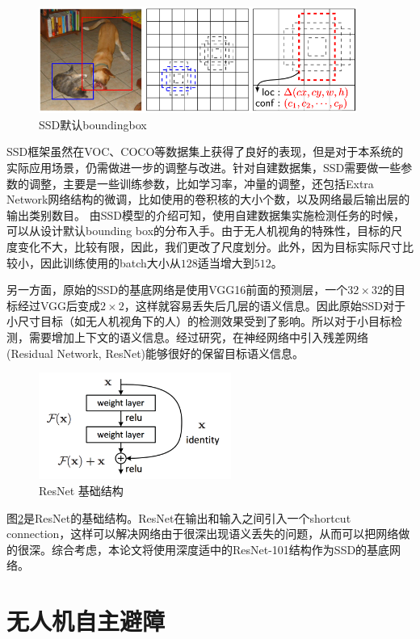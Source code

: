 \begin{figure}[h]
    \centering
    \includegraphics[height=3.5cm]{figures/SSD默认boundingbox.png}
    \caption{SSD默认boundingbox}\label{SSDBoundingBox}
\end{figure}

SSD框架虽然在VOC、COCO等数据集上获得了良好的表现，但是对于本系统的实际应用场景，仍需做进一步的调整与改进。针对自建数据集，SSD需要做一些参数的调整，主要是一些训练参数，比如学习率，冲量的调整，还包括Extra Network网络结构的微调，比如使用的卷积核的大小个数，以及网络最后输出层的输出类别数目。
由SSD模型的介绍可知，使用自建数据集实施检测任务的时候，可以从设计默认bounding box的分布入手。由于无人机视角的特殊性，目标的尺度变化不大，比较有限，因此，我们更改了尺度划分。此外，因为目标实际尺寸比较小，因此训练使用的batch大小从$128$适当增大到$512$。

另一方面，原始的SSD的基底网络是使用VGG16前面的预测层，一个$32\times32$的目标经过VGG后变成$2\times2$，这样就容易丢失后几层的语义信息。因此原始SSD对于小尺寸目标（如无人机视角下的人）的检测效果受到了影响。所以对于小目标检测，需要增加上下文的语义信息。经过研究，在神经网络中引入残差网络(Residual Network, ResNet)能够很好的保留目标语义信息。
\begin{figure}[h]
    \centering
    \includegraphics[height=3.5cm]{figures/ResNet.png}
    \caption{ResNet 基础结构}\label{ResNet}
\end{figure}
图\ref{ResNet}是ResNet的基础结构。ResNet在输出和输入之间引入一个shortcut connection，这样可以解决网络由于很深出现语义丢失的问题，从而可以把网络做的很深。综合考虑，本论文将使用深度适中的ResNet-101结构作为SSD的基底网络。



\section{无人机自主避障}

